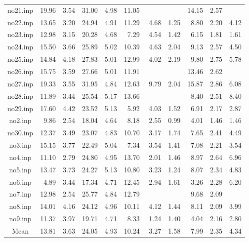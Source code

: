 {\begin{longtable}{@{}cr@{\hspace{1em}}r@{\hspace{1em}}r@{\hspace{1em}}r@{\hspace{1em}}r@{\hspace{2em}}r@{\hspace{1em}}r@{\hspace{1em}}r@{\hspace{1em}}r@{\hspace{1em}}r@{}}
no21.inp&19.96&3.54&31.00&4.98&11.05&&&14.15&2.57&\\
no22.inp&13.65&3.20&24.94&4.91&11.29&4.68&1.25&8.80&2.20&4.12\\
no23.inp&12.98&3.15&20.28&4.68&7.29&4.54&1.42&6.15&1.81&1.61\\
no24.inp&15.50&3.66&25.89&5.02&10.39&4.63&2.04&9.13&2.57&4.50\\
no25.inp&14.84&4.18&27.83&5.01&12.99&4.02&2.19&9.80&2.75&5.78\\
no26.inp&15.75&3.59&27.66&5.01&11.91&&&13.46&2.62&\\
no27.inp&19.33&3.55&31.95&4.84&12.63&9.79&2.04&15.87&2.86&6.08\\
no28.inp&11.89&3.44&25.54&5.17&13.66&&&8.40&2.51&8.40\\
no29.inp&17.60&4.42&23.52&5.13&5.92&4.03&1.52&6.91&2.17&2.87\\
no2.inp&9.86&2.54&18.04&4.64&8.18&2.55&0.99&4.01&1.46&1.46\\
no30.inp&12.37&3.49&23.07&4.83&10.70&3.17&1.74&7.65&2.41&4.49\\
no3.inp&15.15&3.77&22.49&5.04&7.34&3.54&1.41&7.08&2.21&3.54\\
no4.inp&11.10&2.79&24.80&4.95&13.70&2.01&1.46&8.97&2.64&6.96\\
no5.inp&13.47&3.73&24.27&5.13&10.80&3.23&1.24&8.07&2.34&4.83\\
no6.inp&4.89&3.44&17.34&4.71&12.45&-2.94&1.61&3.26&2.28&6.20\\
no7.inp&12.98&2.54&25.77&4.84&12.79&&&9.68&2.09&\\
no8.inp&14.01&4.16&24.12&4.96&10.11&4.12&1.44&8.11&2.09&3.99\\
no9.inp&11.37&3.97&19.71&4.71&8.33&1.24&1.40&4.04&2.16&2.80\\
\midrule
Mean&13.81&3.63&24.05&4.93&10.24&3.27&1.58&7.99&2.35&4.34\\
\bottomrule
\end{longtable}}
